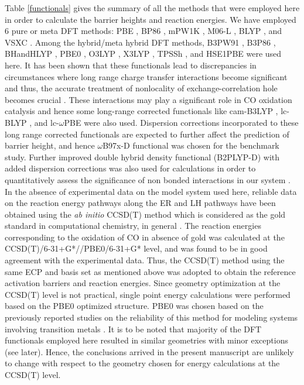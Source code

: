 Table \ref{functionals} gives the summary of all the methods that were employed here in order to calculate the barrier heights and reaction energies. We have employed 6 pure or meta DFT methods: PBE \cite{perdew1996}, BP86 \cite{perdew1986,becke1988}, mPW1K \cite{adamo1998}, M06-L \cite{Peverati2012}, BLYP \cite{becke1993,lee1988}, and VSXC \cite{van1998}. Among the hybrid/meta hybrid DFT methods, B3PW91 \cite{becke1988,perdew1996}, B3P86 \cite{becke1988,perdew1986}, BHandHLYP \cite{becke1993,lee1988}, PBE0 \cite{perdew1996,admano1999}, O3LYP \cite{handy2001,Hoe2001}, X3LYP \cite{becke1988,lee1988,Xu2004}, TPSSh \cite{tpssh2003,tao2003}, and HSE1PBE \cite{HSE2004,HSE22004,heyd2005,hyed2006,perdew1996} were used here. It has been shown that these functionals lead to discrepancies in circumstances where long range charge transfer interactions become significant and thus, the accurate treatment of nonlocality of exchange-correlation hole becomes crucial \cite{iikura2001long,andreas2005}. These interactions may play a significant role in CO oxidation catalysis and hence some long-range corrected functionals like cam-B3LYP \cite{yanai2004new}, lc-BLYP \cite{iikura2001long}, and lc-$\omega$PBE \cite{vydrov2006assessment,vydrov2006importance,vydrov2007tests} were also used. Dispersion corrections incorporated to these long range corrected functionals are expected to further affect the prediction of barrier height, and hence $\omega$B97x-D functional \cite{chai2008,minekov2012} was chosen for the benchmark study. Further improved double hybrid density functional (B2PLYP-D) with added dispersion corrections was also used for calculations in order to quantitatively assess the significance of non bonded interactions in our system \cite{grimme2006,grimme2007}. \\
In the absence of experimental data on the model system used here, reliable data on the reaction energy pathways along the ER and LH pathways have been obtained using the \textit{ab initio} CCSD(T) \cite{raghavachari1989fifth} method which is considered as the gold standard in computational chemistry, in general \cite{kang2012accurate,sun2013performance,weymuth2014new,jan2013}. The reaction energies corresponding to the oxidation of CO in absence of gold was calculated at the CCSD(T)/6-31+G*//PBE0/6-31+G* level, and was found to be in good agreement with the experimental data. Thus, the CCSD(T) method using the same ECP and basis set as mentioned above was adopted to obtain the reference activation barriers and reaction energies. Since geometry optimization at the CCSD(T) level is not practical, single point energy calculations were performed based on the PBE0 optimized structure. PBE0 was chosen based on the previously reported studies on the reliability of this method for modeling systems involving transition metals \cite{Wu2004,wang2005removing,adamo2000inexpensive,paier2007does,stroppa2007co,johansson2004au32}.
It is to be noted that majority of the DFT functionals employed here resulted in similar geometries with minor exceptions (see later). Hence, the conclusions arrived in the present manuscript are unlikely to change with respect to the geometry chosen for energy calculations at the CCSD(T) level.

